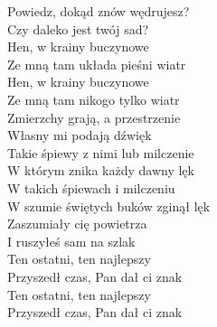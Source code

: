 
Powiedz, dokąd znów wędrujesz?  \\
Czy daleko jest twój sad? \tab{}\\
Hen, w krainy buczynowe \tab{} \\
Ze mną tam układa pieśni wiatr \\
 Hen, w krainy buczynowe \tab{}\\
 Ze mną tam nikogo tylko wiatr \\
\hops
Zmierzchy grają, a przestrzenie \\
Własny mi podają dźwięk \\
Takie śpiewy z nimi lub milczenie \\
W którym znika każdy dawny lęk \\
 W takich śpiewach i milczeniu \\
 W szumie świętych buków zginął lęk \\
\hops
Zaszumiały cię powietrza \\
I ruszyłeś sam na szlak \\
Ten ostatni, ten najlepszy \\
Przyszedł czas, Pan dał ci znak \\
 Ten ostatni, ten najlepszy \\
 Przyszedł czas, Pan dał ci znak \\

